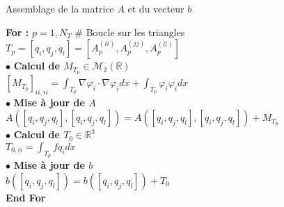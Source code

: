 \documentclass[12pt,a4paper]{article}
\begin{document}
\begin{algorithm}[H]
    \caption{Assemblage de la matrice $A$ et du vecteur $b$}
    \textbf{For :} $p = 1, N_T$ \# Boucle sur les triangles $T_p= [q_i, q_j, q_l] = [A_p^{(ii)}, A_p^{(jj)}, A_p^{(ll)}]$ \\
    \vspace{0.5cm}
    \hspace{0.5cm} $\bullet$ \textbf{Calcul de $M_{T_p} \in \mathcal{M}_2(\mathbb{R})$} \\
    \hspace{0.5cm} $\left[ M_{T_p} \right]_{ii, ii} = \int_{T_p} \nabla \varphi_i \cdot \nabla \varphi_i dx + \int_{T_p} \varphi_i \varphi_i dx$ \\
    \vspace{0.5cm}
    \hspace{0.5cm} $\bullet$ \textbf{Mise à jour de $A$} \\
    \hspace{0.5cm} $A(\left[q_i, q_j, q_l\right], \left[q_i, q_j, q_l\right]) = A(\left[q_i, q_j, q_l\right], \left[q_i, q_j, q_l\right]) + M_{T_p}$ \\
    \vspace{0.5cm}
    \hspace{0.5cm} $\bullet$ \textbf{Calcul de $T_0 \in \mathbb{R}^3$} \\
    \hspace{0.5cm} $T_{0, ii} = \int_{T_p} f q_i dx$ \\
    \vspace{0.5cm}
    \hspace{0.5cm} $\bullet$ \textbf{Mise à jour de $b$} \\
    \hspace{0.5cm} $b(\left[q_i, q_j, q_l\right]) = b(\left[q_i, q_j, q_l\right]) + T_0$ \\
    \vspace{0.5cm}
    \textbf{End For}  
\end{algorithm}
\end{document}
